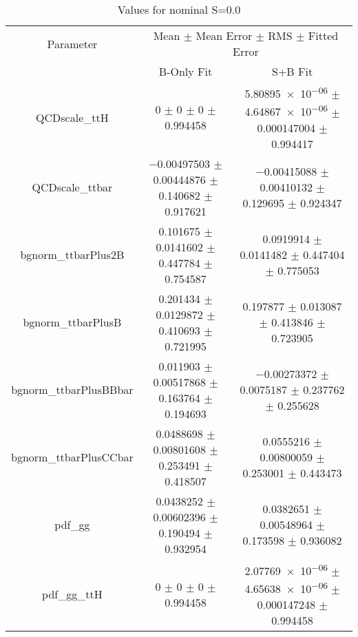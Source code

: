 \begin{table}
\centering
\caption{Values for nominal S=0.0}
\begin{tabular}{ccc}
\toprule
Parameter & \multicolumn{2}{c}{Mean $\pm$ Mean Error $\pm$ RMS $\pm$ Fitted Error}\\
 & B-Only Fit & S+B Fit\\
\midrule
QCDscale\_ttH & \num{0} $\pm$ \num{0} $\pm$ \num{0} $\pm$ \num{0.994458} & \num{5.80895e-06} $\pm$ \num{4.64867e-06} $\pm$ \num{0.000147004} $\pm$ \num{0.994417}\\
QCDscale\_ttbar & \num{-0.00497503} $\pm$ \num{0.00444876} $\pm$ \num{0.140682} $\pm$ \num{0.917621} & \num{-0.00415088} $\pm$ \num{0.00410132} $\pm$ \num{0.129695} $\pm$ \num{0.924347}\\
bgnorm\_ttbarPlus2B & \num{0.101675} $\pm$ \num{0.0141602} $\pm$ \num{0.447784} $\pm$ \num{0.754587} & \num{0.0919914} $\pm$ \num{0.0141482} $\pm$ \num{0.447404} $\pm$ \num{0.775053}\\
bgnorm\_ttbarPlusB & \num{0.201434} $\pm$ \num{0.0129872} $\pm$ \num{0.410693} $\pm$ \num{0.721995} & \num{0.197877} $\pm$ \num{0.013087} $\pm$ \num{0.413846} $\pm$ \num{0.723905}\\
bgnorm\_ttbarPlusBBbar & \num{0.011903} $\pm$ \num{0.00517868} $\pm$ \num{0.163764} $\pm$ \num{0.194693} & \num{-0.00273372} $\pm$ \num{0.0075187} $\pm$ \num{0.237762} $\pm$ \num{0.255628}\\
bgnorm\_ttbarPlusCCbar & \num{0.0488698} $\pm$ \num{0.00801608} $\pm$ \num{0.253491} $\pm$ \num{0.418507} & \num{0.0555216} $\pm$ \num{0.00800059} $\pm$ \num{0.253001} $\pm$ \num{0.443473}\\
pdf\_gg & \num{0.0438252} $\pm$ \num{0.00602396} $\pm$ \num{0.190494} $\pm$ \num{0.932954} & \num{0.0382651} $\pm$ \num{0.00548964} $\pm$ \num{0.173598} $\pm$ \num{0.936082}\\
pdf\_gg\_ttH & \num{0} $\pm$ \num{0} $\pm$ \num{0} $\pm$ \num{0.994458} & \num{2.07769e-06} $\pm$ \num{4.65638e-06} $\pm$ \num{0.000147248} $\pm$ \num{0.994458}\\
\bottomrule
\end{tabular}
\end{table}